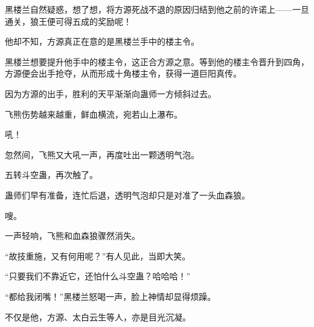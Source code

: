 \begin{this_body}
黑楼兰自然疑惑，想了想，将方源死战不退的原因归结到他之前的许诺上——一旦通关，狼王便可得五成的奖励呢！

他却不知，方源真正在意的是黑楼兰手中的楼主令。

黑楼兰想要提升他手中的楼主令，这正合方源之意。等到他的楼主令晋升到四角，方源便会出手抢夺，从而形成十角楼主令，获得一道巨阳真传。

因为方源的出手，胜利的天平渐渐向蛊师一方倾斜过去。

飞熊伤势越来越重，鲜血横流，宛若山上瀑布。

吼！

忽然间，飞熊又大吼一声，再度吐出一颗透明气泡。

五转斗空蛊，再次触了。

蛊师们早有准备，连忙后退，透明气泡却只是对准了一头血森狼。

嗖。

一声轻响，飞熊和血森狼骤然消失。

“故技重施，又有何用呢？”有人见此，当即大笑。

“只要我们不靠近它，还怕什么斗空蛊？哈哈哈！”

“都给我闭嘴！”黑楼兰怒喝一声，脸上神情却显得烦躁。

不仅是他，方源、太白云生等人，亦是目光沉凝。

\end{this_body}

